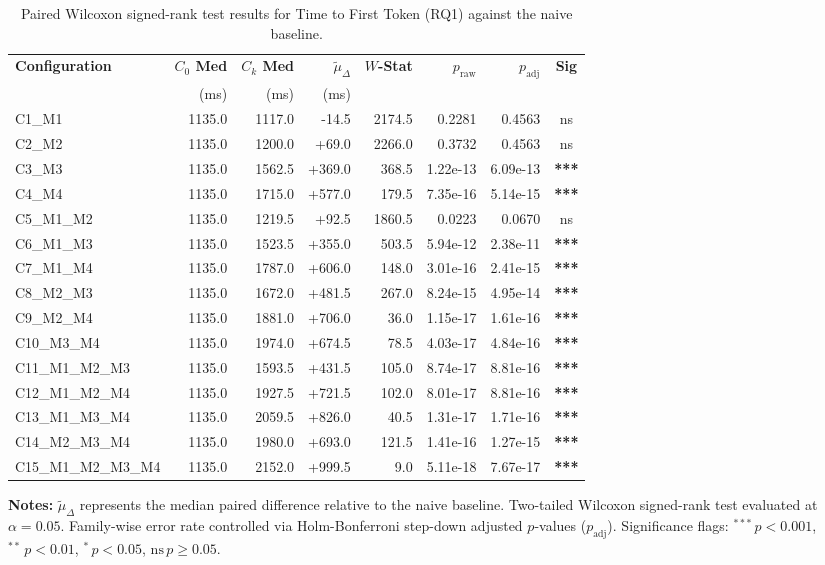 \begin{table}[!htbp]
\centering
\small
\caption{Paired Wilcoxon signed-rank test results for Time to First Token (RQ1) against the naive baseline.}
\label{tab:wilcoxon_rq1_ttft}
\begin{tabular*}{\textwidth}{@{\extracolsep{\fill}} l r r r r r r c @{}}
\toprule
\textbf{Configuration} & \textbf{$C_0$ Med} & \textbf{$C_k$ Med} & \textbf{$\tilde{\mu}_\Delta$} & \textbf{$W$-Stat} & \textbf{$p_{\text{raw}}$} & \textbf{$p_{\text{adj}}$} & \textbf{Sig} \\
 & \scriptsize{(ms)} & \scriptsize{(ms)} & \scriptsize{(ms)} & & & & \\
\midrule
C1\_M1 & 1135.0 & 1117.0 & -14.5 & 2174.5 & 0.2281 & 0.4563 & ns \\
C2\_M2 & 1135.0 & 1200.0 & +69.0 & 2266.0 & 0.3732 & 0.4563 & ns \\
C3\_M3 & 1135.0 & 1562.5 & +369.0 & 368.5 & 1.22e-13 & 6.09e-13 & \textbf{***} \\
C4\_M4 & 1135.0 & 1715.0 & +577.0 & 179.5 & 7.35e-16 & 5.14e-15 & \textbf{***} \\
C5\_M1\_M2 & 1135.0 & 1219.5 & +92.5 & 1860.5 & 0.0223 & 0.0670 & ns \\
C6\_M1\_M3 & 1135.0 & 1523.5 & +355.0 & 503.5 & 5.94e-12 & 2.38e-11 & \textbf{***} \\
C7\_M1\_M4 & 1135.0 & 1787.0 & +606.0 & 148.0 & 3.01e-16 & 2.41e-15 & \textbf{***} \\
C8\_M2\_M3 & 1135.0 & 1672.0 & +481.5 & 267.0 & 8.24e-15 & 4.95e-14 & \textbf{***} \\
C9\_M2\_M4 & 1135.0 & 1881.0 & +706.0 & 36.0 & 1.15e-17 & 1.61e-16 & \textbf{***} \\
C10\_M3\_M4 & 1135.0 & 1974.0 & +674.5 & 78.5 & 4.03e-17 & 4.84e-16 & \textbf{***} \\
C11\_M1\_M2\_M3 & 1135.0 & 1593.5 & +431.5 & 105.0 & 8.74e-17 & 8.81e-16 & \textbf{***} \\
C12\_M1\_M2\_M4 & 1135.0 & 1927.5 & +721.5 & 102.0 & 8.01e-17 & 8.81e-16 & \textbf{***} \\
C13\_M1\_M3\_M4 & 1135.0 & 2059.5 & +826.0 & 40.5 & 1.31e-17 & 1.71e-16 & \textbf{***} \\
C14\_M2\_M3\_M4 & 1135.0 & 1980.0 & +693.0 & 121.5 & 1.41e-16 & 1.27e-15 & \textbf{***} \\
C15\_M1\_M2\_M3\_M4 & 1135.0 & 2152.0 & +999.5 & 9.0 & 5.11e-18 & 7.67e-17 & \textbf{***} \\
\bottomrule
\end{tabular*}
\vspace{0.5em}
\parbox{\textwidth}{\footnotesize
\textbf{Notes:} $\tilde{\mu}_\Delta$ represents the median paired difference relative to the naive baseline. Two-tailed Wilcoxon signed-rank test evaluated at $\alpha = 0.05$. Family-wise error rate controlled via Holm-Bonferroni step-down adjusted $p$-values ($p_{\text{adj}}$). Significance flags: $^{***}\,p < 0.001$, $^{**}\,p < 0.01$, $^{*}\,p < 0.05$, $\text{ns}\,p \ge 0.05$.}
\end{table}
